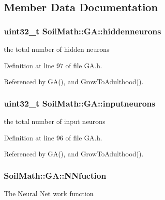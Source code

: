 \subsection{Member Data Documentation}
\hypertarget{class_soil_math_1_1_g_a_a3f1eee7492f68a05b9b06ee8afb2ec20}{}
\subsubsection[{hiddenneurons}]{\setlength{\rightskip}{0pt plus 5cm}uint32\+\_\+t Soil\+Math\+::\+G\+A\+::hiddenneurons\hspace{0.3cm}{\ttfamily [private]}}\label{class_soil_math_1_1_g_a_a3f1eee7492f68a05b9b06ee8afb2ec20}
the total number of hidden neurons 

Definition at line 97 of file G\+A.\+h.



Referenced by G\+A(), and Grow\+To\+Adulthood().

\hypertarget{class_soil_math_1_1_g_a_ac32591e30dde5ac854ae57a7b9e33298}{}
\subsubsection[{inputneurons}]{\setlength{\rightskip}{0pt plus 5cm}uint32\+\_\+t Soil\+Math\+::\+G\+A\+::inputneurons\hspace{0.3cm}{\ttfamily [private]}}\label{class_soil_math_1_1_g_a_ac32591e30dde5ac854ae57a7b9e33298}
the total number of input neurons 

Definition at line 96 of file G\+A.\+h.



Referenced by G\+A(), and Grow\+To\+Adulthood().

\hypertarget{class_soil_math_1_1_g_a_a9b690048c89c32e3153457378b5e1c31}{}
\subsubsection[{N\+Nfuction}]{ Soil\+Math\+::\+G\+A\+::\+N\+Nfuction\hspace{0.3cm}{\ttfamily [private]}}\label{class_soil_math_1_1_g_a_a9b690048c89c32e3153457378b5e1c31}
The Neural Net work function 

